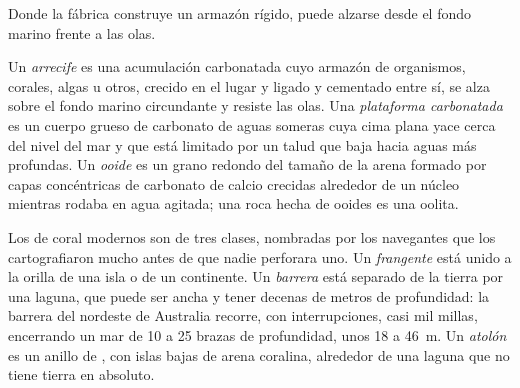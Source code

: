 Donde la fábrica construye un armazón rígido, puede alzarse desde el fondo marino frente a las olas.

\begin{definition}\label{def:b1:chemical-biogenic-sediments:reef}
Un \emph{arrecife} es una acumulación carbonatada cuyo armazón de organismos, corales, algas u otros, crecido en el lugar y ligado y cementado entre sí, se alza
sobre el fondo marino circundante y resiste las olas. Una \emph{plataforma carbonatada} es un cuerpo grueso de carbonato de aguas someras cuya cima plana
yace cerca del nivel del mar y que está limitado por un talud que baja hacia aguas más profundas. Un \emph{ooide} es un grano redondo del tamaño de la arena formado por capas
concéntricas de carbonato de calcio crecidas alrededor de un núcleo mientras rodaba en agua agitada; una roca hecha de ooides es una oolita.
\end{definition}

Los  de coral modernos son de tres clases, nombradas por los navegantes que los cartografiaron mucho antes de que nadie perforara uno. Un  \emph{frangente}
está unido a la orilla de una isla o de un continente. Un  \emph{barrera} está separado de la tierra por una laguna, que puede ser ancha y tener decenas de metros de
profundidad: la barrera del nordeste de Australia recorre, con interrupciones, casi mil millas, encerrando un mar de 10 a 25 brazas de profundidad, unos 18 a \qty{46}{m}. Un
\emph{atolón} es un anillo de , con islas bajas de arena coralina, alrededor de una laguna que no tiene tierra en absoluto.

